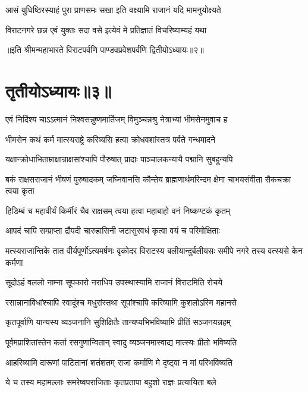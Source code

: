 \twolineshloka
{आसं युधिष्ठिरस्याहं पुरा प्राणसमः सखा}
{इति वक्ष्यामि राजानं यदि मामनुयोक्ष्यते}


\twolineshloka
{विराटनगरे छन्न एवं युक्तः सदा वसे}
{इत्येवं मे प्रतिज्ञातं विचरिष्याम्यहं यथा}

॥इति श्रीमन्महाभारते विराटपर्वणि पाण्डवप्रवेशपर्वणि द्वितीयोऽध्यायः॥२॥

\chapter{तृतीयोऽध्यायः॥३॥}

\twolineshloka
{एवं निर्दिश्य चाऽऽत्मानं निश्वसन्नुष्णमार्तिजम्}
{विमुञ्चन्नश्रु नेत्राभ्यां भीमसेनमुवाच ह}


\twolineshloka
{भीमसेन कथं कर्म मात्स्यराष्ट्रे करिष्यसि}
{हत्वा क्रोधवशांस्तत्र पर्वते गन्धमादने}


\twolineshloka
{यक्षान्क्रोधाभिताम्राक्षान्राक्षसांश्चापि पौरुषात्}
{प्रादाः पाञ्चालकन्यायै पद्मानि सुबहून्यपि}


\threelineshloka
{बकं राक्षसराजानं भीषणं पुरुषादकम्}
{जघ्निवानसि कौन्तेय ब्राह्मणार्थमरिन्दम}
{क्षेमा चाभयसंवीता सैकचक्रा त्वया कृता}


\twolineshloka
{हिडिम्बं च महावीर्यं किर्मीरं चैव राक्षसम्}
{त्वया हत्वा महाबाहो वनं निष्कण्टकं कृतम्}


\twolineshloka
{आपदं चापि सम्प्राप्ता द्रौपदी चारुहासिनी}
{जटासुरवधं कृत्वा वयं च परिमोक्षिताः}


\threelineshloka
{मत्स्यराजान्तिके तात वीर्यपूर्णोऽत्यमर्षणः}
{वृकोदर विराटस्य बलीयान्दुर्बलीयसः}
{समीपे नगरे तस्य वत्स्यसे केन कर्मणा}




\twolineshloka
{सूदोऽहं वललो नाम्ना सूपकारो नराधिप}
{उपस्थास्यामि राजानं विराटमिति रोचये}


\twolineshloka
{रसान्नानाविधांश्चापि स्वादूंश्च मधुरांस्तथा}
{सूपांश्चापि करिष्यामि कुशलोऽस्मि महानसे}


\twolineshloka
{कृतपूर्वाणि यान्यस्य व्यञ्जनानि सुशिक्षितैः}
{तान्यप्यभिभविष्यामि प्रीतिं सञ्जनयन्नहम्}


\twolineshloka
{पूर्वमप्राशितांस्तेन कर्ता रसगुणान्वितान्}
{स्वादु व्यञ्जनमास्वाद्य मात्स्यः प्रीतो भविष्यति}


\twolineshloka
{आहरिष्यामि दारूणां पाटितानां शतंशतम्}
{राजा कर्माणि मे दृष्ट्वा न मां परिभविष्यति}


\twolineshloka
{ये च तस्य महामल्लाः समरेष्वपराजिताः}
{कृतप्रतापा बहुशो राज्ञः प्रत्यायिता बले}


